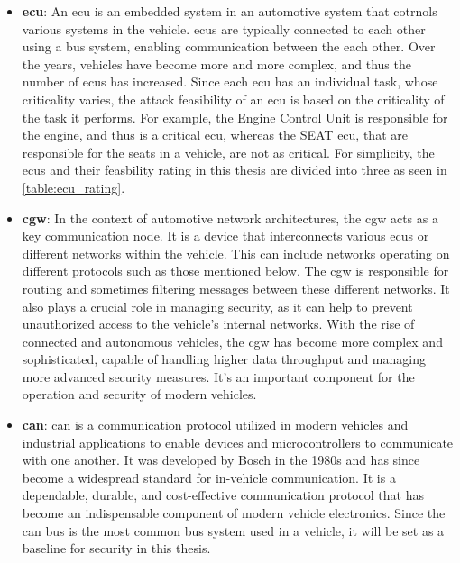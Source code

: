\begin{itemize}
    \item \textbf{\acrshort{ecu}}: An \acrshort{ecu} is an embedded system in an automotive system that cotrnols various systems in the vehicle.
    \acrshort{ecu}s are typically connected to each other using a bus system, enabling communication between the each other.
    Over the years, vehicles have become more and more complex, and thus the number of \acrshort{ecu}s has increased.
    Since each \acrshort{ecu} has an individual task, whose criticality varies, the attack feasibility of an \acrshort{ecu} is based on the criticality of the task it performs.
    For example, the Engine Control Unit is responsible for the engine, and thus is a critical \acrshort{ecu}, 
    whereas the SEAT \acrshort{ecu}, that are responsible for the seats in a vehicle, are not as critical.
    For simplicity, the \acrshort{ecu}s and their feasbility rating in this thesis are divided into three as seen in \ref{table:ecu_rating}.

    \item \textbf{\acrlong{cgw}}: In the context of automotive network architectures, the \acrshort{cgw} acts as a key communication node. 
    It is a device that interconnects various \acrshort{ecu}s or different networks within the vehicle. 
    This can include networks operating on different protocols such as those mentioned below.
    The \acrshort{cgw} is responsible for routing and sometimes filtering messages between these different networks. 
    It also plays a crucial role in managing security, as it can help to prevent unauthorized access to the vehicle's internal networks.
    With the rise of connected and autonomous vehicles, the \acrshort{cgw} has become more complex and sophisticated, 
    capable of handling higher data throughput and managing more advanced security measures. 
    It's an important component for the operation and security of modern vehicles.
    
    \item \textbf{\acrlong{can}}: \acrshort{can} is a communication protocol utilized in modern vehicles and industrial applications 
    to enable devices and microcontrollers to communicate with one another. 
    It was developed by Bosch in the 1980s and has since become a widespread standard for in-vehicle communication.
    It is a dependable, durable, and cost-effective communication protocol that has become an indispensable component of modern vehicle electronics.
    Since the \acrshort{can} bus is the most common bus system used in a vehicle, it will be set as a baseline for security in this thesis.


\end{itemize}
